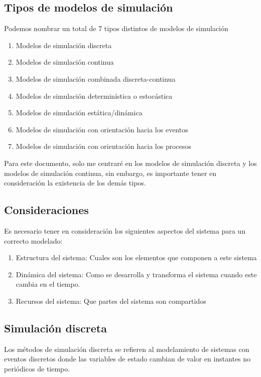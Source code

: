 \subsection*{Tipos de modelos de simulación}
Podemos nombrar un total de 7 tipos distintos de modelos de simulación

\begin{enumerate}
    \item Modelos de simulación discreta
    \item Modelos de simulación continua
    \item Modelos de simulación combinada discreta-continua
    \item Modelos de simulación determinística o estocástica
    \item Modelos de simulación estática/dinámica
    \item Modelos de simulación con orientación hacia los eventos
    \item Modelos de simulación con orientación hacia los procesos
\end{enumerate}

Para este documento, solo me centraré en los modelos de simulación discreta y los modelos de simulación continua, sin embargo, es importante tener en consideración la existencia de los demás tipos.

\subsection*{Consideraciones}
Es necesario tener en consideración los siguientes aspectos del sistema para un correcto modelado:

\begin{enumerate}
    \item Estructura del sistema: Cuales son los elementos que componen a este sistema
    \item Dinámica del sistema: Como se desarrolla y transforma el sistema cuando este cambia en el tiempo.
    \item Recursos del sistema: Que partes del sistema son compartidos
\end{enumerate}

\subsection{Simulación discreta}
Los métodos de simulación discreta se refieren al modelamiento de sistemas con eventos discretos donde las variables de estado cambian de valor en instantes no periódicos de tiempo.

